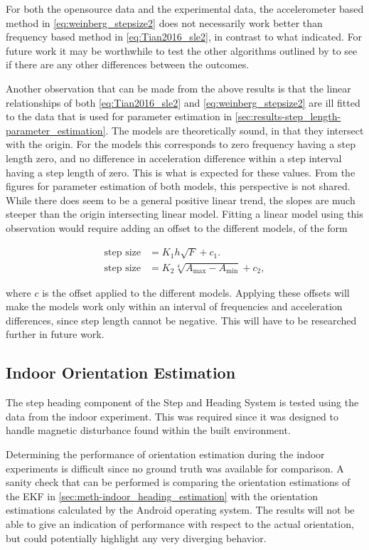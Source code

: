 For both the opensource data and the experimental data, the accelerometer based method in \eqref{eq:weinberg_stepsize2} does not necessarily work better than frequency based method in \eqref{eq:Tian2016_sle2}, in contrast to what \citet{Vezocnik2019} indicated. For future work it may be worthwhile to test the other algorithms outlined by \cite{Vezocnik2019} to see if there are any other differences between the outcomes. \par 

Another observation that can be made from the above results is that the linear relationships of both \eqref{eq:Tian2016_sle2} and \eqref{eq:weinberg_stepsize2} are ill fitted to the data that is used for parameter estimation in \cref{sec:results-step_length-parameter_estimation}. The models are theoretically sound, in that they intersect with the origin. For the models this corresponds to zero frequency having a step length zero, and no difference in acceleration difference within a step interval having a step length of zero. This is what is expected for these values. From the figures for parameter estimation of both models, this perspective is not shared. While there does seem to be a general positive linear trend, the slopes are much steeper than the origin intersecting linear model. Fitting a linear model using this observation would require adding an offset to the different models, of the form

\begin{align}
	\text{step size} &= K_1 h \sqrt{F} + c_1. \\
	\text{step size} &= K_2 \sqrt[4]{A_{\max }-A_{\min }} + c_2,
\end{align}

where $ c $ is the offset applied to the different models. Applying these offsets will make the models work only within an interval of frequencies and acceleration differences, since step length cannot be negative. This will have to be researched further in future work.


\subsection{Indoor Orientation Estimation}
\label{sec-results-Indoor orientation_estimation}
The step heading component of the Step and Heading System is tested using the data from the indoor experiment. This was required since it was designed to handle magnetic disturbance found within the built environment.\par 
Determining the performance of orientation estimation during the indoor experiments is difficult since no ground truth was available for comparison. A sanity check that can be performed is comparing the orientation estimations of the EKF in \cref{sec:meth-indoor_heading_estimation} with the orientation estimations calculated by the Android operating system. The results will not be able to give an indication of performance with respect to the actual orientation, but could potentially highlight any very diverging behavior. \par 

